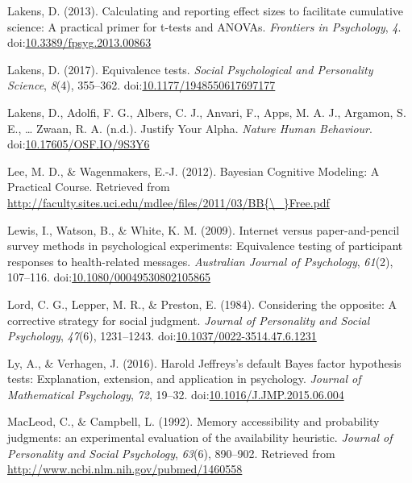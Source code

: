 \documentclass[english,man, mask]{apa6}
\theoremstyle{definition}
\theoremstyle{definition}
\theoremstyle{definition}
\theoremstyle{remark}
\begin{document}
\hypertarget{ref-Lakens2013}{}
Lakens, D. (2013). Calculating and reporting effect sizes to facilitate
cumulative science: A practical primer for t-tests and ANOVAs.
\emph{Frontiers in Psychology}, \emph{4}.
doi:\href{https://doi.org/10.3389/fpsyg.2013.00863}{10.3389/fpsyg.2013.00863}

\hypertarget{ref-Lakens2017a}{}
Lakens, D. (2017). Equivalence tests. \emph{Social Psychological and
Personality Science}, \emph{8}(4), 355--362.
doi:\href{https://doi.org/10.1177/1948550617697177}{10.1177/1948550617697177}

\hypertarget{ref-Lakens2017}{}
Lakens, D., Adolfi, F. G., Albers, C. J., Anvari, F., Apps, M. A. J.,
Argamon, S. E., \ldots{} Zwaan, R. A. (n.d.). Justify Your Alpha.
\emph{Nature Human Behaviour}.
doi:\href{https://doi.org/10.17605/OSF.IO/9S3Y6}{10.17605/OSF.IO/9S3Y6}

\hypertarget{ref-Lee2012}{}
Lee, M. D., \& Wagenmakers, E.-J. (2012). Bayesian Cognitive Modeling: A
Practical Course. Retrieved from
\href{http://faculty.sites.uci.edu/mdlee/files/2011/03/BB\%7B/_\%7DFree.pdf}{http://faculty.sites.uci.edu/mdlee/files/2011/03/BB\{\textbackslash{}\_\}Free.pdf}

\hypertarget{ref-Lewis2009}{}
Lewis, I., Watson, B., \& White, K. M. (2009). Internet versus
paper-and-pencil survey methods in psychological experiments:
Equivalence testing of participant responses to health-related messages.
\emph{Australian Journal of Psychology}, \emph{61}(2), 107--116.
doi:\href{https://doi.org/10.1080/00049530802105865}{10.1080/00049530802105865}

\hypertarget{ref-Lord1984}{}
Lord, C. G., Lepper, M. R., \& Preston, E. (1984). Considering the
opposite: A corrective strategy for social judgment. \emph{Journal of
Personality and Social Psychology}, \emph{47}(6), 1231--1243.
doi:\href{https://doi.org/10.1037/0022-3514.47.6.1231}{10.1037/0022-3514.47.6.1231}

\hypertarget{ref-Ly2016}{}
Ly, A., \& Verhagen, J. (2016). Harold Jeffreys's default Bayes factor
hypothesis tests: Explanation, extension, and application in psychology.
\emph{Journal of Mathematical Psychology}, \emph{72}, 19--32.
doi:\href{https://doi.org/10.1016/J.JMP.2015.06.004}{10.1016/J.JMP.2015.06.004}

\hypertarget{ref-MacLeod1992}{}
MacLeod, C., \& Campbell, L. (1992). Memory accessibility and
probability judgments: an experimental evaluation of the availability
heuristic. \emph{Journal of Personality and Social Psychology},
\emph{63}(6), 890--902. Retrieved from
\url{http://www.ncbi.nlm.nih.gov/pubmed/1460558}
\end{document}
